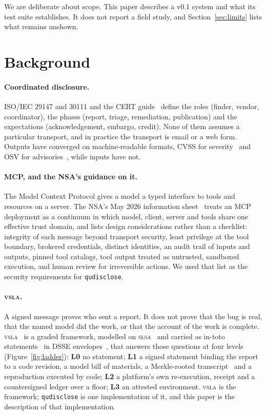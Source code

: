 \documentclass[11pt]{article}
\newcommand{\qud}{\texttt{qudisclose}}
\newcommand{\vsla}{\textsc{vsla}}
\newcommand{\lvl}[1]{\textbf{L#1}}
\begin{document}
\noindent We are deliberate about scope. This paper describes a v0.1 system and what its test suite
establishes. It does not report a field study, and Section~\ref{sec:limits} lists what remains unshown.

\section{Background}

\paragraph{Coordinated disclosure.} ISO/IEC 29147 and 30111 and the CERT guide~\cite{iso29147,iso30111,certcvd}
define the roles (finder, vendor, coordinator), the phases (report, triage, remediation, publication) and the
expectations (acknowledgement, embargo, credit). None of them assumes a particular transport, and in practice
the transport is email or a web form. Outputs have converged on machine-readable formats, CVSS for
severity~\cite{cvss} and OSV for advisories~\cite{osv}, while inputs have not.

\paragraph{MCP, and the NSA's guidance on it.} The Model Context Protocol gives a model a typed interface to
tools and resources on a server. The NSA's May 2026 information sheet~\cite{nsamcp} treats an MCP deployment as
a continuum in which model, client, server and tools share one effective trust domain, and lists design
considerations rather than a checklist: integrity of each message beyond transport security, least privilege at
the tool boundary, brokered credentials, distinct identities, an audit trail of inputs and outputs, pinned tool
catalogs, tool output treated as untrusted, sandboxed execution, and human review for irreversible actions.
We used that list as the security requirements for \qud{}.

\paragraph{\vsla{}.} A signed message proves who sent a report. It does not prove that the bug is real, that the
named model did the work, or that the account of the work is complete. \vsla{}~\cite{vsla} is a graded
framework, modelled on \textsc{slsa}~\cite{slsa} and carried as in-toto statements~\cite{intoto} in DSSE
envelopes~\cite{dsse}, that answers those questions at four levels (Figure~\ref{fig:ladder}): \lvl{0} no
statement; \lvl{1} a signed statement binding the report to a code revision, a model bill of materials, a
Merkle-rooted transcript~\cite{rfc6962} and a reproduction executed by code; \lvl{2} a platform's own
re-execution, receipt and a countersigned ledger over a floor; \lvl{3} an attested environment. \vsla{} is the
framework; \qud{} is one implementation of it, and this paper is the description of that implementation.
\end{document}

